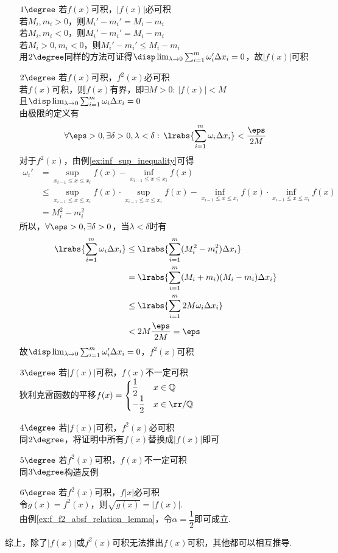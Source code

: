 \begin{analysis}
\begin{enumerate}
	\item[$1\degree$] 若$f(x)$可积，$|f(x)|$必可积\\
若$M_i,m_i>0$，则$M_i'-m_i'=M_i-m_i$\\
若$M_i,m_i<0$，则$M_i'-m_i'=M_i-m_i$\\
若$M_i>0,m_i<0$，则$M_i'-m_i'\leq M_i-m_i$\\
用$2\degree$同样的方法可证得$\disp\lim_{\lambda\to 0}\sum_{i=1}^m\omega'_i\Delta x_i=0$，故$|f(x)|$可积
	\item[$2\degree$] 若$f(x)$可积，$f^2(x)$必可积\\
若$f(x)$可积，则$f(x)$有界，即$\exists M>0:\,|f(x)|<M$\\
且$\disp\lim_{\lambda\to 0}\sum_{i=1}^m\omega_i\Delta x_i=0$\\
由极限的定义有
\[\forall\eps>0,\exists\delta>0,\lambda<\delta:\,\lrabs{\sum_{i=1}^m\omega_i\Delta x_i}<\dfrac{\eps}{2M}\]
对于$f^2(x)$，由例\ref{ex:inf_sup_inequality}可得
\[\begin{aligned}
\omega_i'&=\sup_{x_{i-1}\leq x\leq x_i}f(x)-\inf_{x_{i-1}\leq x\leq x_i}f(x)\\
&\leq \sup_{x_{i-1}\leq x\leq x_i}f(x)\cdot\sup_{x_{i-1}\leq x\leq x_i}f(x)-
\inf_{x_{i-1}\leq x\leq x_i}f(x)\cdot\inf_{x_{i-1}\leq x\leq x_i}f(x)\\
&=M_i^2-m_i^2
\end{aligned}\]
所以，$\forall\eps>0,\exists\delta>0$，当$\lambda<\delta$时有
\[\begin{aligned}
\lrabs{\sum_{i=1}^m\omega_i\Delta x_i}&\leq\lrabs{\sum_{i=1}^m(M_i^2-m_i^2)\Delta x_i}\\
&=\lrabs{\sum_{i=1}^m(M_i+m_i)(M_i-m_i)\Delta x_i}\\
&\leq\lrabs{\sum_{i=1}^m2M\omega_i\Delta x_i}\\
&<2M\dfrac{\eps}{2M}=\eps
\end{aligned}\]
故$\disp\lim_{\lambda\to 0}\sum_{i=1}^m\omega'_i\Delta x_i=0$，$f^2(x)$可积
	\item[$3\degree$] 若$|f(x)|$可积，$f(x)$不一定可积\\
狄利克雷函数的平移$f(x)=\begin{cases}\dfrac{1}{2}&x\in\mathbb{Q}\\
-\dfrac{1}{2}&x\in\rr/\mathbb{Q}\end{cases}$
	\item[$4\degree$] 若$|f(x)|$可积，$f^2(x)$必可积\\
同$2\degree$，将证明中所有$f(x)$替换成$|f(x)|$即可
	\item[$5\degree$] 若$f^2(x)$可积，$f(x)$不一定可积\\
同$3\degree$构造反例
	\item[$6\degree$] 若$f^2(x)$可积，$f|x|$必可积\\
令$g(x)=f^2(x)$，则$\sqrt{g(x)}=|f(x)|$.\\
由例\ref{ex:f_f2_absf_relation_lemma}，令$\alpha=\dfrac{1}{2}$即可成立.
\end{enumerate}
\par 综上，除了$|f(x)|$或$f^2(x)$可积无法推出$f(x)$可积，其他都可以相互推导.
\end{analysis}

